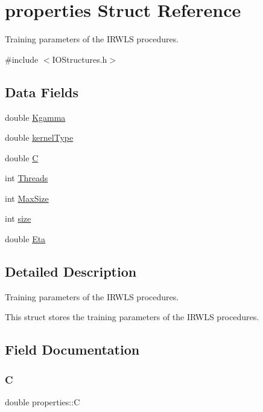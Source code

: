\hypertarget{structproperties}{}\section{properties Struct Reference}
\label{structproperties}


Training parameters of the I\+R\+W\+LS procedures.  




{\ttfamily \#include $<$I\+O\+Structures.\+h$>$}

\subsection*{Data Fields}
\begin{DoxyCompactItemize}
\item 
double \hyperlink{structproperties_aab9c0195a446f08fc782701750ddb6ac}{Kgamma}
\item 
double \hyperlink{structproperties_a498e1588ce31c3265632f17f7d65c624}{kernel\+Type}
\item 
double \hyperlink{structproperties_a3b98814395b295db30f029e5e67ae9c9}{C}
\item 
int \hyperlink{structproperties_a56ab77c44fb808e71990074bd75529ed}{Threads}
\item 
int \hyperlink{structproperties_a42219768dd35e1ab628e1785759df400}{Max\+Size}
\item 
int \hyperlink{structproperties_a1694aebbbdd904f9b0e5faca725966b6}{size}
\item 
double \hyperlink{structproperties_abd91deb543a31a6a1f75892af7cf95c8}{Eta}
\end{DoxyCompactItemize}


\subsection{Detailed Description}
Training parameters of the I\+R\+W\+LS procedures. 

This struct stores the training parameters of the I\+R\+W\+LS procedures. 

\subsection{Field Documentation}
\hypertarget{structproperties_a3b98814395b295db30f029e5e67ae9c9}{}\label{structproperties_a3b98814395b295db30f029e5e67ae9c9} 
\subsubsection{\texorpdfstring{C}{C}}
{\ttfamily double properties\+::C}

